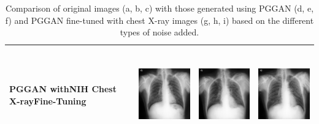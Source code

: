 \begin{table}[H]
\begin{tabularx}{\linewidth}{@{}>{\centering\arraybackslash}m{3cm}>{\centering\arraybackslash}X>{\centering\arraybackslash}X>{\centering\arraybackslash}X@{}}
PGGAN with\newline NIH Chest X-ray\newline Fine-Tuning & \includegraphics[valign=M,width=\linewidth,height=4cm,keepaspectratio]{main/content/images/pggan/train_pneumo_finetuned_chestxray/111.png} & \includegraphics[valign=M,width=\linewidth,height=4cm,keepaspectratio]{main/content/images/pggan/train_pneumo_finetuned_chestxray/112.png} & \includegraphics[valign=M,width=\linewidth,height=4cm,keepaspectratio]{main/content/images/pggan/train_pneumo_finetuned_chestxray/113.png} \\
\bottomrule
\end{tabularx}
\caption{Comparison of original images (a, b, c) with those generated using PGGAN (d, e, f) and PGGAN fine-tuned with chest X-ray images (g, h, i) based on the different types of noise added.}
\label{tab:image_comparison_pggan}
\end{table}
